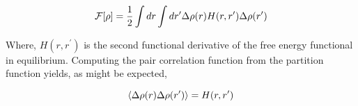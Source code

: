\begin{equation}
	\mathcal{F}[\rho] = \frac{1}{2}\int dr \int dr^\prime \Delta \rho(r) H(r, r^\prime) \Delta \rho(r^\prime)
\end{equation}

Where, $H(r, r^\prime)$ is the second functional derivative of the free energy functional in equilibrium. Computing the pair correlation function from the partition function yields, as might be expected, 

\begin{equation}
	\left\langle \Delta\rho(r) \Delta\rho(r^\prime) \right\rangle = H(r, r^\prime)
\end{equation}
